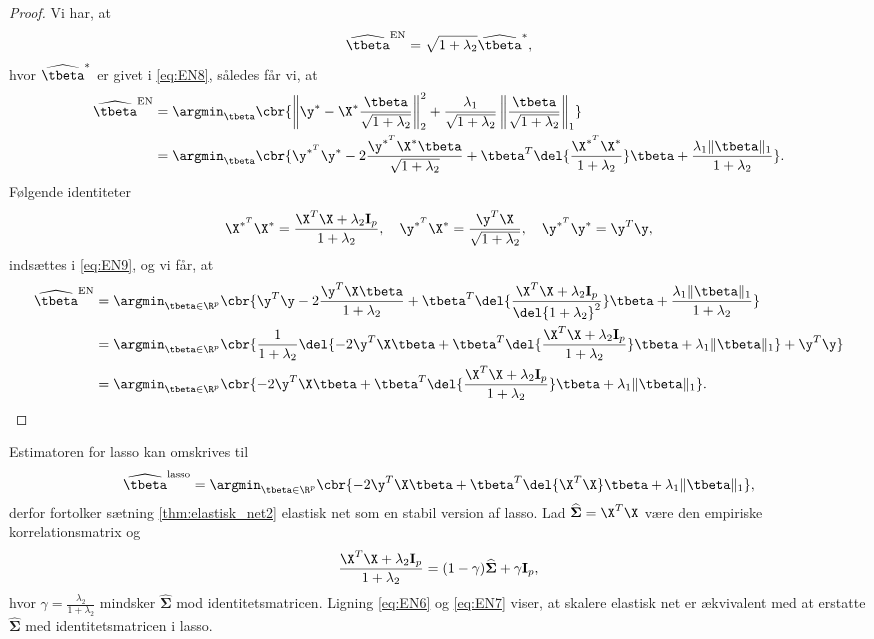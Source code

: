 \begin{proof}
Vi har, at
\begin{align*}
\widehat{\tbeta}^\text{EN} = \sqrt{1+\lambda_2} \widehat{\tbeta}^*,
\end{align*}
hvor \(\widehat{\tbeta}^*\) er givet i \eqref{eq:EN8}, således får vi, at
\begin{align}
\widehat{\tbeta}^\text{EN} &= \argmin_{\tbeta} \cbr{\left\Vert \y^* - \X^* \frac{\tbeta}{\sqrt{1+\lambda_2}} \right\Vert_2^2 + \frac{\lambda_1}{\sqrt{1+\lambda_2}} \left\Vert \frac{\tbeta}{\sqrt{1+\lambda_2}} \right\Vert_1} \nonumber \\
&=\argmin_{\tbeta} \cbr{ \y^{*^T} \y^* - 2 \frac{\y^{*^T} \X^* \tbeta}{\sqrt{1+\lambda_2}} + \tbeta^T \del{\frac{\X^{*^T} \X^*}{1+\lambda_2}} \tbeta + \frac{\lambda_1 \Vert \tbeta \Vert_1}{1+\lambda_2}}. \label{eq:EN9}
\end{align}
Følgende identiteter
\begin{align*}
\X^{*^T} \X^* = \frac{\X^T \X + \lambda_2 \mathbf{I}_p}{1+ \lambda_2}, \quad \y^{*^T} \X^* = \frac{\y^T \X}{\sqrt{1+\lambda_2}} , \quad \y^{*^T} \y^* = \y^T \y, 
\end{align*}
indsættes i \eqref{eq:EN9}, og vi får, at
\begin{align*}
\widehat{\tbeta}^\text{EN} &= \argmin_{\tbeta \in \R^p} \cbr{\y^T \y - 2 \frac{\y^T \X \tbeta}{1+\lambda_2} + \tbeta^T \del{\frac{\X^T \X + \lambda_2 \mathbf{I}_p}{\del{1+\lambda_2}^2}} \tbeta + \frac{\lambda_1 \Vert \tbeta \Vert_1}{1+\lambda_2}} \\ 
&= \argmin_{\tbeta \in \R^p} \cbr{\frac{1}{1+\lambda_2} \del{- 2 \y^T \X \tbeta + \tbeta^T \del{\frac{\X^T \X + \lambda_2 \mathbf{I}_p}{1+ \lambda_2}} \tbeta + \lambda_1 \Vert \tbeta \Vert_1} + \y^T \y} \\
&= \argmin_{\tbeta \in \R^p} \cbr{- 2 \y^T \X \tbeta + \tbeta^T \del{\frac{\X^T \X + \lambda_2 \mathbf{I}_p}{1+ \lambda_2}} \tbeta + \lambda_1 \Vert \tbeta \Vert_1}.
\end{align*}
\end{proof}
%
Estimatoren for lasso kan omskrives til
\begin{align}
\widehat{\tbeta}^\text{lasso} = \argmin_{\tbeta \in \R^p} \cbr{ - 2 \y^T \X \tbeta + \tbeta^T \del{\X^T \X} \tbeta  + \lambda_1 \Vert \tbeta \Vert_1}, \label{eq:EN7}
\end{align}
derfor fortolker sætning \ref{thm:elastisk_net2} elastisk net som en stabil version af lasso.
Lad \(\widehat{\boldsymbol{\Sigma}} = \X^T \X\) være den empiriske korrelationsmatrix og
\begin{align*}
\frac{\X^T \X + \lambda_2 \mathbf{I}_p}{1 + \lambda_2} = (1-\gamma) \widehat{\boldsymbol{\Sigma}} + \gamma \mathbf{I}_p,
\end{align*}
hvor \(\gamma=\frac{\lambda_2}{1+\lambda_2}\) mindsker \(\widehat{\boldsymbol{\Sigma}}\) mod identitetsmatricen.
Ligning \eqref{eq:EN6} og \eqref{eq:EN7} viser, at skalere elastisk net er ækvivalent med at erstatte \(\widehat{\boldsymbol{\Sigma}}\) med identitetsmatricen i lasso.

